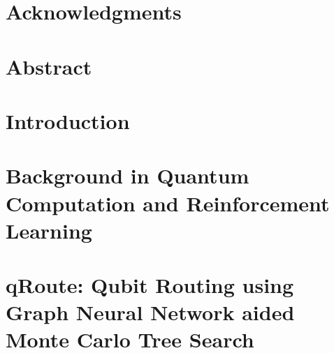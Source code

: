 \documentclass[11pt]{book}
\renewcommand{\baselinestretch}{1.2}
\begin{document}



\newpage
\thispagestyle{empty}
\renewcommand{\thesisdedication}{{\large Copyright \copyright~~Animesh Sinha, 2022\\}{\large All Rights Reserved\\}}
\thesisdedicationpage



\newpage
\thispagestyle{empty}
\renewcommand{\thesisdedication}{\large To Compute}
\thesisdedicationpage

\mastersthesis
\renewcommand{\baselinestretch}{1.5}

\chapter*{Acknowledgments}
\label{ch:ack}


\chapter*{Abstract}
\label{ch:abstract}


\tableofcontents
\listoffigures
\listoftables

\chapter{Introduction}
\label{ch:intro}


\chapter{Background in Quantum Computation and Reinforcement Learning}
\label{ch:background}



\chapter{qRoute: Qubit Routing using Graph Neural Network aided Monte Carlo Tree Search}
\label{ch:qroute}

\end{document}
